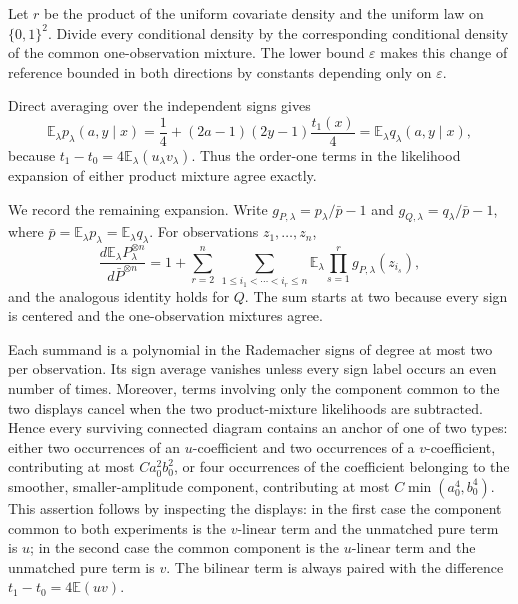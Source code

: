 Let \(r\) be the product of the uniform covariate density and the uniform law on \(\{0,1\}^2\). Divide every conditional density by the corresponding conditional density of the common one-observation mixture. The lower bound \(\varepsilon\) makes this change of reference bounded in both directions by constants depending only on \(\varepsilon\).

Direct averaging over the independent signs gives
\[
\mathbb E_\lambda p_\lambda(a,y\mid x)
=\frac14+(2a-1)(2y-1)\frac{t_1(x)}4
=\mathbb E_\lambda q_\lambda(a,y\mid x),
\]
because \(t_1-t_0=4\mathbb E_\lambda(u_\lambda v_\lambda)\). Thus the order-one terms in the likelihood expansion of either product mixture agree exactly.

We record the remaining expansion. Write \(g_{P,\lambda}=p_\lambda/\bar p-1\) and \(g_{Q,\lambda}=q_\lambda/\bar p-1\), where \(\bar p=\mathbb E_\lambda p_\lambda=\mathbb E_\lambda q_\lambda\). For observations \(z_1,\ldots,z_n\),
\[
\frac{d\mathbb E_\lambda P_\lambda^{\otimes n}}{d\bar P^{\otimes n}}
=1+\sum_{r=2}^n\ \sum_{1\le i_1<\cdots<i_r\le n}
\mathbb E_\lambda\prod_{s=1}^r g_{P,\lambda}(z_{i_s}),
\]
and the analogous identity holds for \(Q\). The sum starts at two because every sign is centered and the one-observation mixtures agree.

Each summand is a polynomial in the Rademacher signs of degree at most two per observation. Its sign average vanishes unless every sign label occurs an even number of times. Moreover, terms involving only the component common to the two displays cancel when the two product-mixture likelihoods are subtracted. Hence every surviving connected diagram contains an anchor of one of two types: either two occurrences of an \(u\)-coefficient and two occurrences of a \(v\)-coefficient, contributing at most \(C a_0^2b_0^2\), or four occurrences of the coefficient belonging to the smoother, smaller-amplitude component, contributing at most \(C\min(a_0^4,b_0^4)\). This assertion follows by inspecting the displays: in the first case the component common to both experiments is the \(v\)-linear term and the unmatched pure term is \(u\); in the second case the common component is the \(u\)-linear term and the unmatched pure term is \(v\). The bilinear term is always paired with the difference \(t_1-t_0=4\mathbb E(uv)\).

